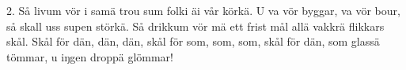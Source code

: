 2.  Så livum vör i samä trou
    sum folki äi vår körkä.
    U va vör byggar, va vör bour,
    så skall uss supen störkä.
    Så drikkum vör mä ett frist mål
    allä vakkrä flikkars skål.
    Skål för dän, dän, dän,
    skål för som, som, som,
    skål för dän, som glassä tömmar,
    u iŋgen droppä glömmar!
